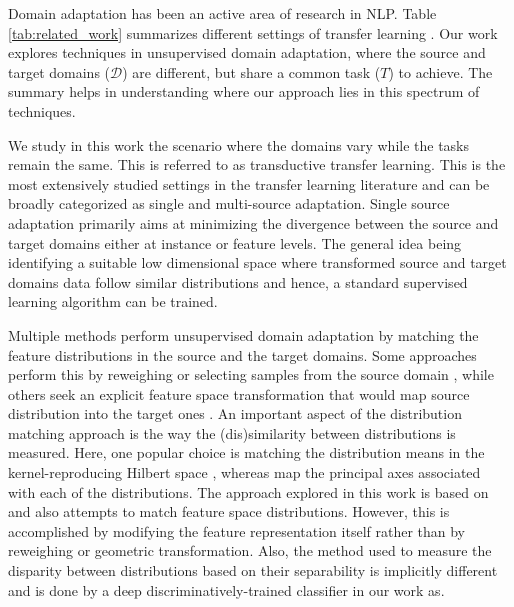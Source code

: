 \documentclass{sigkddExp}
\begin{document}
Domain adaptation has been an active area of research in NLP. Table \ref{tab:related_work}  summarizes different settings of transfer learning \cite{pan2010survey}. Our work explores techniques in unsupervised domain adaptation, where the source and target domains ($\mathcal{D}$) are different, but share a common task ($T$) to achieve. The summary helps in understanding where our approach lies in this spectrum of techniques.

We study in this work the scenario where the domains vary while the tasks remain the same. This is referred to as transductive transfer learning. This is the most extensively studied settings in the transfer learning literature and can be broadly categorized as single and multi-source adaptation. Single source adaptation\cite{chen2009extracting, ando2005framework, daume2009frustratingly} primarily aims at minimizing the divergence between the source and target domains either at instance or feature levels. The general idea being identifying a suitable low dimensional space where transformed source and target domains data follow similar distributions and hence, a standard supervised learning algorithm can be trained.

Multiple methods perform unsupervised domain adaptation by matching the feature distributions in the source and the target domains. Some approaches perform this by reweighing or selecting samples from the source domain  \cite{borgwardt2006integrating, huang2007correcting, gong2012geodesic}, while others seek an explicit feature space transformation that would map source distribution into the target ones \cite{pan2011domain, gopalan2011domain, baktashmotlagh2013unsupervised}. An important  aspect of the distribution matching approach is the way the (dis)similarity between distributions is measured. Here, one popular choice is matching the distribution means in the kernel-reproducing Hilbert space \cite{borgwardt2006integrating, huang2007correcting}, whereas \cite{gong2012geodesic, fernando2013unsupervised} map the principal axes associated with each of the distributions. The approach explored in this work is based on \cite{ganin2015unsupervised} and also attempts to match feature space distributions. However, this is accomplished by modifying the feature representation itself rather than by reweighing or geometric transformation. Also, the method used to measure the disparity between distributions based on their separability is implicitly different and is done by a deep discriminatively-trained classifier in our work as.
\end{document}
